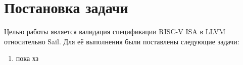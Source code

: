 
\section{Постановка задачи}
\label{sec:task}

Целью работы является валидация спецификации RISC-V ISA в
LLVM относительно Sail. Для её выполнения были постав\-лены следующие задачи:
\begin{enumerate}
    \item пока хз
\end{enumerate}

